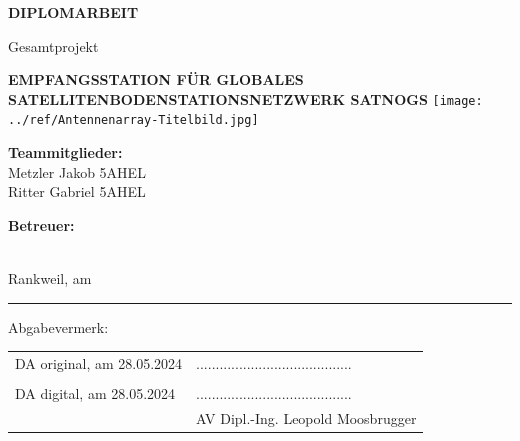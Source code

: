\documentclass[hidelinks,12pt,a4paper,twoside]{report}
\begin{document}
	\begin{center}
		\textbf {\huge {\uppercase {Diplomarbeit}}}
		\par \large {Gesamtprojekt}
		\par \textbf {\huge {\uppercase {Empfangsstation für globales Satellitenbodenstationsnetzwerk SatNOGS}}}
		\vspace{0.3cm}
		\linebreak
		\texttt{[image: ../ref/Antennenarray-Titelbild.jpg]}
	\end{center}
	
	\vfill %
	
	
	\begin{minipage}[t] {0.4\textwidth}
		\textbf{Teammitglieder:} \\
		Metzler Jakob \textbar{} 5AHEL \\
		Ritter Gabriel \textbar{} 5AHEL \\
	\end{minipage}
	\begin{minipage}[t] {0.4\textwidth}
		\textbf{Betreuer:} \\		
		\supervisor \\
	\end{minipage}
	
	\par Rankweil, am \PrintDate \\		
	
	\noindent\rule{\textwidth}{0.4pt}
	Abgabevermerk:
	\linebreak
	
	\begin{tabular}{p{7cm}C{6cm}}
		\hspace{1cm} DA original, am 28.05.2024 & ........................................ \\ 
		& \supervisor \\ [2.5em]
		
		\hspace{1cm} DA digital, am 28.05.2024 & ........................................ \\ 
		& AV Dipl.-Ing. Leopold Moosbrugger \\
	\end{tabular}
	
	
	\newpage
	
	\SecAuth{\emplLastA, \emplLastB} %
	
\end{document}

